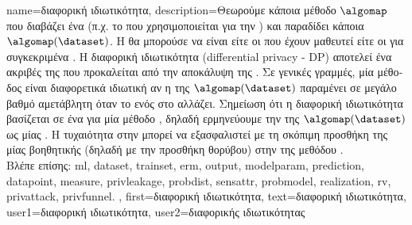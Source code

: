 {name={\foreignlanguage{greek}{διαφορική ιδιωτικότητα}},
 	description={\foreignlanguage{greek}{Θεωρούμε κάποια μέθοδο}  
		$\algomap$ \foreignlanguage{greek}{που διαβάζει ένα}  (\foreignlanguage{greek}{π.χ. το}  
  		\foreignlanguage{greek}{που χρησιμοποιείται για την} ) \foreignlanguage{greek}{και παραδίδει κάποια}  
		$\algomap(\dataset)$. \foreignlanguage{greek}{Η}  \foreignlanguage{greek}{θα μπορούσε να είναι είτε οι}
  		 \foreignlanguage{greek}{που έχουν μαθευτεί είτε οι}  \foreignlanguage{greek}{για 
		συγκεκριμένα} . 
  		\foreignlanguage{greek}{Η διαφορική ιδιωτικότητα} (differential privacy - DP) \foreignlanguage{greek}{αποτελεί ένα ακριβές} 
		 \foreignlanguage{greek}{της}  \foreignlanguage{greek}{που προκαλείται από την 
		αποκάλυψη της} . \foreignlanguage{greek}{Σε γενικές γραμμές, μία μέθοδος}  
		\foreignlanguage{greek}{είναι διαφορετικά ιδιωτική αν η}  \foreignlanguage{greek}{της}  
		$\algomap(\dataset)$ \foreignlanguage{greek}{παραμένει σε μεγάλο βαθμό αμετάβλητη όταν το}  
  		\foreignlanguage{greek}{ενός}  \foreignlanguage{greek}{στο}  \foreignlanguage{greek}{αλλάζει.  
		Σημείωση ότι η διαφορική ιδιωτικότητα βασίζεται σε ένα}  \foreignlanguage{greek}{για μία μέθοδο} , 
		\foreignlanguage{greek}{δηλαδή ερμη\-νεύ\-ου\-με την}  \foreignlanguage{greek}{της $\algomap(\dataset)$ 
  		ως}  \foreignlanguage{greek}{μίας} . \foreignlanguage{greek}{Η τυχαιότητα στην}  
		\foreignlanguage{greek}{μπορεί να εξασφαλιστεί με τη σκόπιμη προσθήκη της}  \foreignlanguage{greek}{μίας 
		βοηθητικής}  (\foreignlanguage{greek}{δηλαδή με την προσθήκη θορύβου) στην}
  		 \foreignlanguage{greek}{της μεθόδου} .
				\\ 
		\foreignlanguage{greek}{Βλέπε επίσης:} \gls{ml}, \gls{dataset}, \gls{trainset}, \gls{erm}, \gls{output}, \gls{modelparam}, \gls{prediction}, 
		\gls{datapoint}, \gls{measure}, \gls{privleakage}, \gls{probdist}, \gls{sensattr}, \gls{probmodel}, \gls{realization}, \gls{rv}, \gls{privattack}, \gls{privfunnel}. }, 
	first={\foreignlanguage{greek}{διαφορική ιδιωτικότητα}},
	text={\foreignlanguage{greek}{διαφορική ιδιωτικότητα}},
	user1={\foreignlanguage{greek}{διαφορική ιδιωτικότητα}}, %
   	user2={\foreignlanguage{greek}{διαφορικής ιδιωτικότητας}} %
}


